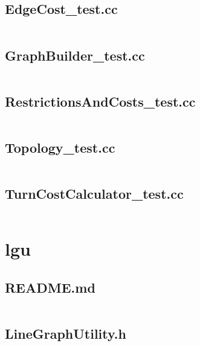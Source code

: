 \documentclass[../main.tex]{subfiles}
\begin{document}
\subsection{EdgeCost\_test.cc}\label{lst:graph-edge-cost-test-cc}
\inputminted[linenos=true]{cpp}{parts/code/graph/catchtest/EdgeCost_test.cc}

\subsection{GraphBuilder\_test.cc}\label{lst:graph-graph-builder-test-cc}
\inputminted[linenos=true]{cpp}{parts/code/graph/catchtest/GraphBuilder_test.cc}

\subsection{RestrictionsAndCosts\_test.cc}\label{lst:graph-restrictions-and-costs-test-cc}
\inputminted[linenos=true]{cpp}{parts/code/graph/catchtest/RestrictionsAndCosts_test.cc}

\subsection{Topology\_test.cc}\label{lst:graph-topology-test-cc}
\inputminted[linenos=true]{cpp}{parts/code/graph/catchtest/Topology_test.cc}

\subsection{TurnCostCalculator\_test.cc}\label{lst:graph-turn-cost-calculator-test-cc}
\inputminted[linenos=true]{cpp}{parts/code/graph/catchtest/TurnCostCalculator_test.cc}

\section{lgu}

\subsection{README.md}\label{lst:lgu-readme-md}
\inputminted[breaklines=true]{text}{parts/code/lgu/README.md}

\subsection{LineGraphUtility.h}\label{lst:lgu-linegraph-utility-h}
\inputminted[linenos=true]{cpp}{parts/code/lgu/LineGraphUtility.h}
\end{document}
